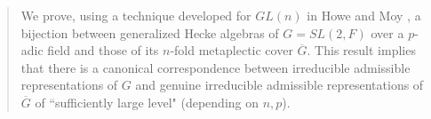 

\newcommand{\abstracttext}{We prove, using a technique developed for 
$GL(n)$ in Howe and Moy \cite{H}, 
a bijection between generalized Hecke
algebras of $G=SL(2,F)$ over a $p$-adic field
and those of its $n$-fold metaplectic cover $\overline{G}$. 
This result implies that
there is a canonical correspondence
between irreducible admissible representations of $G$ and 
genuine irreducible admissible representations of $\overline{G}$
of ``sufficiently large level" (depending on $n,p$).}


\newtheorem{thm}{Theorem}[section]
\newtheorem{prop}[thm]{Proposition}
\newtheorem{lem}[thm]{Lemma}
\newtheorem{cor}[thm]{Corollary}

\theoremstyle{definition}

\newtheorem{defn}[thm]{Definition}
\newtheorem{notation}[thm]{Notation}
\newtheorem{conj}[thm]{Conjecture}
\newtheorem{prob}[thm]{Problem}

\theoremstyle{remark}

\newtheorem{rem}[thm]{Remark}



\newtheorem{theorem}{Theorem}
\newtheorem{corollary}[theorem]{Corollary}
\newtheorem{conjecture}[theorem]{Conjecture}
\newtheorem{lemma}[theorem]{Lemma}
\newtheorem{proposition}[theorem]{Proposition}
\newtheorem{definition}[theorem]{Definition}
\newtheorem{example}[theorem]{Example}
\newtheorem{axiom}{Axiom}
\newtheorem{remark}{Remark}
\newtheorem{exercise}{Exercise}[section]


 
\maketitle
\begin{abstract} \abstracttext \end{abstract} 

